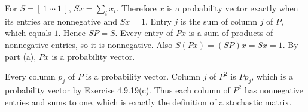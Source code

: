 For $S=[\,1\ \cdots\ 1\,]$, $Sx=\sum_i x_i$.
Therefore $x$ is a probability vector exactly when its entries are
nonnegative and $Sx=1$.
Entry $j$ is the sum of column $j$ of $P$, which equals $1$.
Hence $SP=S$.
Every entry of $Px$ is a sum of products of nonnegative entries, so it
is nonnegative. Also $S(Px)=(SP)x=Sx=1$.
By part (a), $Px$ is a probability vector.

Every column $p_j$ of $P$ is a probability vector. Column $j$ of $P^2$
is $Pp_j$, which is a probability vector by Exercise 4.9.19(c).
Thus each column of $P^2$ has nonnegative entries and sums to one,
which is exactly the definition of a stochastic matrix.

